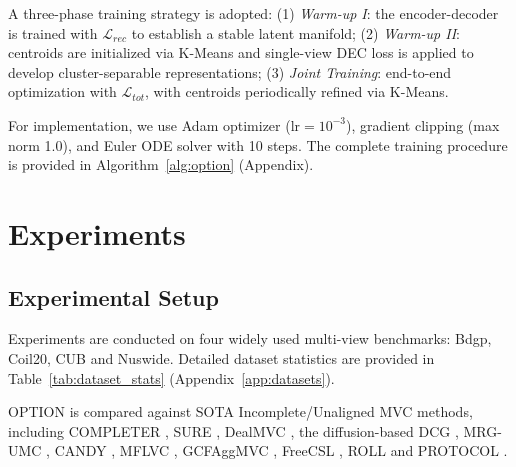 \documentclass{article}
\theoremstyle{plain}
\theoremstyle{definition}
\theoremstyle{remark}
\begin{document}
A three-phase training strategy is adopted: (1) \textit{Warm-up I}: the encoder-decoder is trained with $\mathcal{L}_{rec}$ to establish a stable latent manifold; (2) \textit{Warm-up II}: centroids are initialized via K-Means and single-view DEC loss is applied to develop cluster-separable representations; (3) \textit{Joint Training}: end-to-end optimization with $\mathcal{L}_{tot}$, with centroids periodically refined via K-Means.

For implementation, we use Adam optimizer ($\text{lr}=10^{-3}$), gradient clipping (max norm 1.0), and Euler ODE solver with 10 steps. The complete training procedure is provided in Algorithm~\ref{alg:option} (Appendix).

\section{Experiments}
\label{sec:experiments}


\subsection{Experimental Setup}
\label{subsec:setup}

Experiments are conducted on four widely used multi-view benchmarks: Bdgp, Coil20, CUB and Nuswide. Detailed dataset statistics are provided in Table~\ref{tab:dataset_stats} (Appendix~\ref{app:datasets}).

OPTION is compared against SOTA Incomplete/Unaligned MVC methods, including COMPLETER \cite{linCOMPLETERIncompleteMultiview2021}, SURE \cite{yangRobustMultiViewClustering2023}, DealMVC \cite{yangDealMVCDualContrastive2023}, the diffusion-based DCG \cite{zhangIncompleteMultiviewClustering2025a}, MRG-UMC \cite{xinMultilevelReliableGuidance2025}, CANDY \cite{guoRobustContrastiveMultiview2024}, MFLVC \cite{xuMultilevelFeatureLearning2022}, GCFAggMVC \cite{yanGCFAggGlobalCrossView2023}, FreeCSL \cite{daiImputationfreeAlignmentfreeIncomplete2025a}, ROLL \cite{sunROLLRobustNoisy2025} and PROTOCOL \cite{xuePROTOCOLPartialOptimal2025}.
\end{document}
